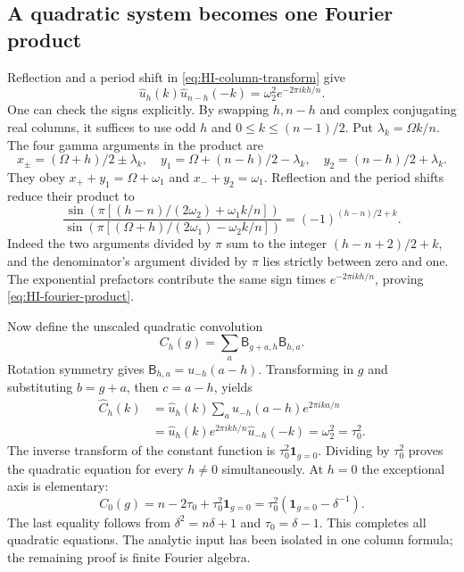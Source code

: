 \subsection{A quadratic system becomes one Fourier product}

Reflection and a period shift in
\eqref{eq:HI-column-transform} give
\begin{equation}\label{eq:HI-fourier-product}
 \widehat u_h(k)\widehat u_{n-h}(-k)
       =\omega_2^2e^{-2\pi ikh/n}.
\end{equation}
One can check the signs explicitly. By swapping $h,n-h$ and
complex conjugating real columns, it suffices to use odd $h$ and
$0\leq k\leq(n-1)/2$. Put $\lambda_k=\Omega k/n$.
The four gamma arguments in the product are
\[
 x_\pm=(\Omega+h)/2\pm\lambda_k,\quad
 y_1=\Omega+(n-h)/2-\lambda_k,\quad
 y_2=(n-h)/2+\lambda_k.
\]
They obey $x_++y_1=\Omega+\omega_1$ and
$x_-+y_2=\omega_1$. Reflection and the period shifts
reduce their product to
\[
 \frac{\sin\!\left(\pi[(h-n)/(2\omega_2)+\omega_1k/n]\right)}
 {\sin\!\left(\pi[(\Omega+h)/(2\omega_1)-\omega_2k/n]\right)}
 =(-1)^{(h-n)/2+k}.
\]
Indeed the two arguments divided by $\pi$ sum to the integer
$(h-n+2)/2+k$, and the denominator's argument divided by
$\pi$ lies strictly between zero and one. The exponential prefactors contribute
the same sign times $e^{-2\pi ikh/n}$, proving
\eqref{eq:HI-fourier-product}.

Now define the unscaled quadratic convolution
\[
 C_h(g)=\sum_a\mathsf B_{g+a,h}\mathsf B_{h,a}.
\]
Rotation symmetry gives
$\mathsf B_{h,a}=u_{-h}(a-h)$. Transforming in $g$ and
substituting $b=g+a$, then $c=a-h$, yields
\begin{align*}
 \widehat C_h(k)
 &=\widehat u_h(k)\sum_a u_{-h}(a-h)e^{2\pi ika/n}\\
 &=\widehat u_h(k)e^{2\pi ikh/n}\widehat u_{-h}(-k)
 =\omega_2^2=\tau_0^2.
\end{align*}
The inverse transform of the constant function is
$\tau_0^2\mathbf1_{g=0}$. Dividing by $\tau_0^2$ proves
the quadratic equation for every $h\ne0$ simultaneously.
At $h=0$ the exceptional axis is elementary:
\[
 C_0(g)=n-2\tau_0+\tau_0^2\mathbf1_{g=0}
       =\tau_0^2(\mathbf1_{g=0}-\delta^{-1}).
\]
The last equality follows from $\delta^2=n\delta+1$ and
$\tau_0=\delta-1$. This completes all quadratic equations.
The analytic input has been isolated in one column formula;
the remaining proof is finite Fourier algebra.

